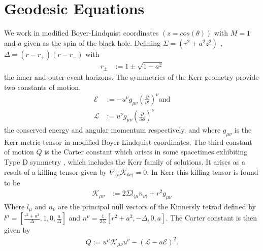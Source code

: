\documentclass[12pt, amsmath]{revtex4-2}
\newcommand\EN{\mathcal{E}}
\newcommand\ANG{\mathcal{L}}
\begin{document}
\section{Geodesic Equations}\label{sec:GeodesicEquations}
We work in modified Boyer-Lindquist coordinates $(z = cos(\theta))$ with $M =1$ and $a$ given as the spin of the black hole. Defining $\Sigma =(r^2+a^2z^2)$ , $\Delta = (r-r_{+})(r-r_{-})$ with 
\begin{align}
    r_{\pm} &:= 1 \pm \sqrt{1-a^2}
\end{align}
the inner and outer event horizons. The symmetries of the Kerr geometry provide two constants of motion,
\begin{align}
    \EN &:= -u^{\nu}g_{\mu\nu}\left(\frac{\partial}{\partial t}\right)^{\nu} \text{and}\\
    \ANG &:=  u^{\nu}g_{\mu\nu}\left(\frac{\partial}{\partial \phi}\right)^{\nu} 
\end{align}
 the conserved energy and angular momentum respectively, and where $ g_{\mu\nu}$ is the Kerr metric tensor in modified Boyer-Lindquist coordinates. The third constant of motion $Q$ is the Carter constant \cite{Carter:1968rr} which arises in some spacetimes exhibiting Type D symmetry \cite{Walker:1970un}, which includes the Kerr family of solutions. It arises as a result of a killing tensor given by $\nabla_{(a}\mathcal{K}_{bc)} = 0$. In Kerr this killing tensor is found to be  
\begin{align}
    \mathcal{K}_{\mu\nu} &:= 2\Sigma l_{(\mu} n_{\nu)} + r^2 g_{\mu\nu}
\end{align}
Where $l_{\mu}$ and $n_{\nu}$ are the principal null vectors of the Kinnersly tetrad \cite{Kinnersley:1969zza} defined by $l^{\mu} = [\frac{r^2+a^2}{\Delta}, 1 , 0, \frac{a}{\Delta} ]$ and $n^{\nu} = \frac{1}{ 2\Sigma}[r^2+a^2, -\Delta , 0, a ] $. The Carter constant is then given by 
\begin{align}
    Q:= u^{\mu}\mathcal{K}_{\mu\nu}u^{\nu} - (\ANG-a\EN)^2.
\end{align}
\end{document}
